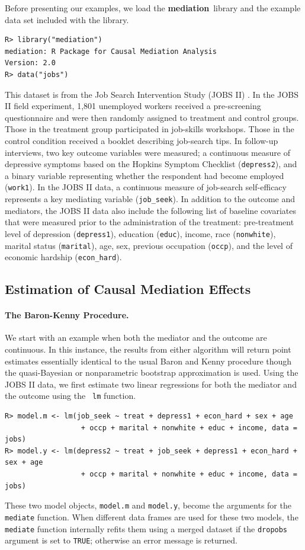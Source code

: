 \documentclass[11pt,letterpaper]{article}
\theoremstyle{plain}
\newcommand\bmediation{{\bf mediation}}
\begin{document}
Before presenting our examples, we load the \bmediation\ library and
the example data set included with the library.
\begin{verbatim}
R> library("mediation")
mediation: R Package for Causal Mediation Analysis
Version: 2.0
R> data("jobs")
\end{verbatim}
This dataset is from the Job Search Intervention Study (JOBS II)
\citep{Vinokur:1997}. In the JOBS II field experiment, 1,801
unemployed workers received a pre-screening questionnaire and were
then randomly assigned to treatment and control groups. Those in the
treatment group participated in job-skills workshops.  Those in the
control condition received a booklet describing job-search tips. In
follow-up interviews, two key outcome variables were measured; a
continuous measure of depressive symptoms based on the Hopkins Symptom
Checklist (\texttt{depress2}), and a binary variable representing
whether the respondent had become employed (\texttt{work1}). In the
JOBS II data, a continuous measure of job-search self-efficacy
represents a key mediating variable (\texttt{job\_seek}). In addition
to the outcome and mediators, the JOBS II data also include the
following list of baseline covariates that were measured prior to the
administration of the treatment: pre-treatment level of depression
(\texttt{depress1}), education (\texttt{educ}), income, race
(\texttt{nonwhite}), marital status (\texttt{marital}), age, sex,
previous occupation (\texttt{occp}), and the level of economic
hardship (\texttt{econ\_hard}).

\subsection{Estimation of Causal Mediation Effects}

\paragraph{The Baron-Kenny Procedure.}
We start with an example when both the mediator and the outcome are
continuous.  In this instance, the results from either algorithm will
return point estimates essentially identical to the usual Baron and
Kenny procedure though the quasi-Bayesian or nonparametric bootstrap
approximation is used.  Using the JOBS II data, we first estimate two
linear regressions for both the mediator and the outcome using the {\tt
lm} function.
\begin{verbatim}
R> model.m <- lm(job_seek ~ treat + depress1 + econ_hard + sex + age
                  + occp + marital + nonwhite + educ + income, data = jobs)
R> model.y <- lm(depress2 ~ treat + job_seek + depress1 + econ_hard + sex + age
                  + occp + marital + nonwhite + educ + income, data = jobs)
\end{verbatim}
These two model objects, {\tt model.m} and {\tt model.y}, become the
arguments for the \texttt{mediate} function.  When different data frames
are used for these two models, the {\tt mediate} function internally refits
them using a merged dataset if the {\tt dropobs} argument is set to 
{\tt TRUE}; otherwise an error message is returned.
\end{document}
